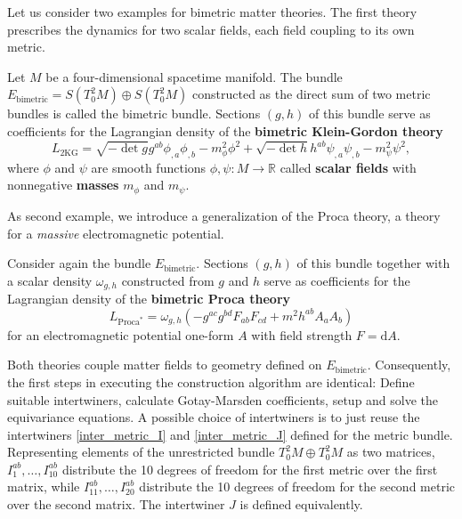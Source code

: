Let us consider two examples for bimetric matter theories. The first theory prescribes the dynamics for two scalar fields, each field coupling to its own metric.
\begin{definition}
  Let $M$ be a four-dimensional spacetime manifold. The bundle $E_\text{bimetric} = S(T^2_0M) \oplus S(T^2_0M)$ constructed as the direct sum of two metric bundles is called the bimetric bundle. Sections $(g,h)$ of this bundle serve as coefficients for the Lagrangian density of the \textbf{bimetric Klein-Gordon theory}
  \begin{equation}
    L_\text{2KG} = \sqrt{-\operatorname{det}g}g^{ab} \phi_{,a}\phi_{,b} - m_\phi^2 \phi^2 + \sqrt{-\operatorname{det}h}h^{ab} \psi_{,a}\psi_{,b} - m_\psi^2 \psi^2,
  \end{equation}
  where $\phi$ and $\psi$ are smooth functions $\phi,\psi\colon M\rightarrow \mathbb R$ called \textbf{scalar fields} with nonnegative \textbf{masses} $m_\phi$ and $m_\psi$.
\end{definition}
As second example, we introduce a generalization of the Proca theory, a theory for a \emph{massive} electromagnetic potential.
\begin{definition}
  Consider again the bundle $E_\text{bimetric}$. Sections $(g,h)$ of this bundle together with a scalar density $\omega_{g,h}$ constructed from $g$ and $h$ serve as coefficients for the Lagrangian density of the \textbf{bimetric Proca theory}
  \begin{equation}
    L_{\text{Proca}^\ast} = \omega_{g,h}\left( -g^{ac} g^{bd} F_{ab} F_{cd} + m^2 h^{ab} A_a A_b \right)
  \end{equation}
  for an electromagnetic potential one-form $A$ with field strength $F=\mathrm dA$.
\end{definition}

Both theories couple matter fields to geometry defined on $E_\text{bimetric}$. Consequently, the first steps in executing the construction algorithm are identical: Define suitable intertwiners, calculate Gotay-Marsden coefficients, setup and solve the equivariance equations. A possible choice of intertwiners is to just reuse the intertwiners \eqref{inter_metric_I} and \eqref{inter_metric_J} defined for the metric bundle. Representing elements of the unrestricted bundle $T^2_0M\oplus T^2_0M$ as two matrices, $I_1^{ab},\dots,I_{10}^{ab}$ distribute the 10 degrees of freedom for the first metric over the first matrix, while $I_{11}^{ab},\dots,I_{20}^{ab}$ distribute the 10 degrees of freedom for the second metric over the second matrix. The intertwiner $J$ is defined equivalently.

